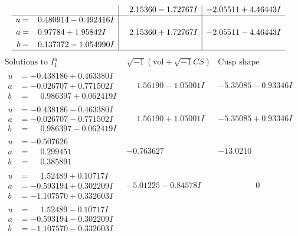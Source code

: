 \documentclass[1p]{elsarticle_modified}
\theoremstyle{definition}
\newcommand{\I}{\sqrt{-1}}
\begin{document}
$$\begin{array}{c|c|c}
 & \phantom{-}2.15360 - 1.72767 I & -2.05511 + 4.46443 I \\ \hline\begin{aligned}
u &= \phantom{-}0.480914 - 0.492416 I \\
a &= \phantom{-}0.97784 + 1.95842 I \\
b &= \phantom{-}0.137372 - 1.054990 I\end{aligned}
 & \phantom{-}2.15360 + 1.72767 I & -2.05511 - 4.46443 I\\
 \hline 
 \end{array}$$\newpage$$\begin{array}{c|c|c}  
\text{Solutions to }I^u_{1}& \I (\text{vol} + \sqrt{-1}CS) & \text{Cusp shape}\\
 \hline 
\begin{aligned}
u &= -0.438186 + 0.463380 I \\
a &= -0.026707 + 0.771502 I \\
b &= \phantom{-}0.986397 + 0.062419 I\end{aligned}
 & \phantom{-}1.56190 - 1.05001 I & -5.35085 - 0.93346 I \\ \hline\begin{aligned}
u &= -0.438186 - 0.463380 I \\
a &= -0.026707 - 0.771502 I \\
b &= \phantom{-}0.986397 - 0.062419 I\end{aligned}
 & \phantom{-}1.56190 + 1.05001 I & -5.35085 + 0.93346 I \\ \hline\begin{aligned}
u &= -0.507626\phantom{ +0.000000I} \\
a &= \phantom{-}0.299451\phantom{ +0.000000I} \\
b &= \phantom{-}0.385891\phantom{ +0.000000I}\end{aligned}
 & -0.763627\phantom{ +0.000000I} & -13.0210\phantom{ +0.000000I} \\ \hline\begin{aligned}
u &= \phantom{-}1.52489 + 0.10717 I \\
a &= -0.593194 + 0.302209 I \\
b &= -1.107570 + 0.332603 I\end{aligned}
 & -5.01225 - 0.84578 I & \phantom{-0.000000 } 0 \\ \hline\begin{aligned}
u &= \phantom{-}1.52489 - 0.10717 I \\
a &= -0.593194 - 0.302209 I \\
b &= -1.107570 - 0.332603 I\end{aligned}

\end{array}$$
\end{document}
